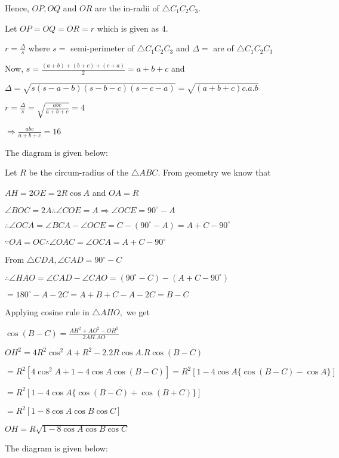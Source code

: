   Hence, $OP, OQ$ and $OR$ are the in-radii of $\triangle C_1C_2C_3.$

  Let $OP=OQ=OR = r$ which is given as $4.$

  $r = \frac{\Delta}{s}$ where $s =$ semi-perimeter of $\triangle C_1C_2C_3$ and $\Delta =$ are of
  $\triangle C_1C_2C_3$

  Now, $s = \frac{(a + b) + (b + c) + (c + a)}{2} = a + b + c$ and

  $\Delta = \sqrt{s(s - a - b)(s - b - c)(s - c - a)} = \sqrt{(a + b + c)c.a.b}$

  $r = \frac{\Delta}{s} = \sqrt{\frac{abc}{a + b + c}} = 4$

  $\Rightarrow \frac{abc}{a + b + c} = 16$

\item The diagram is given below:

  \startplacefigure
    \externalfigure[20_9.pdf]
  \stopplacefigure

  Let $R$ be the circum-radius of the $\triangle ABC.$ From geometry we know that

  $AH = 2OE = 2R\cos A$ and $OA = R$

  $\angle BOC = 2A \therefore \angle COE = A \Rightarrow \angle OCE = 90^\circ - A$

  $\therefore \angle OCA = \angle BCA - \angle OCE = C - (90^\circ - A) = A + C - 90^\circ$

  $\because OA = OC \therefore \angle OAC = \angle OCA = A + C - 90^\circ$

  From $\triangle CDA, \angle CAD = 90^\circ - C$

  $\therefore \angle HAO = \angle CAD - \angle CAO = (90^\circ - C) - (A + C - 90^\circ)$

  $= 180^\circ - A - 2C = A + B + C - A - 2C = B - C$

  Applying cosine rule in $\triangle AHO,$ we get

  $\cos(B - C) = \frac{AH^2 + AO^2 - OH^2}{2AH.AO}$

  $OH^2 = 4R^2\cos^2A + R^2 - 2.2R\cos A.R\cos(B - C)$

  $= R^2[4\cos^2A + 1 - 4\cos A\cos(B - C)] = R^2[1 - 4\cos A\{\cos(B - C) - \cos A\}]$

  $= R^2[1 - 4\cos A\{\cos(B - C) + \cos(B + C)\}]$

  $= R^2[1 - 8\cos A\cos B\cos C]$

  $OH = R\sqrt{1 - 8\cos A\cos B\cos C}$
\item The diagram is given below:

